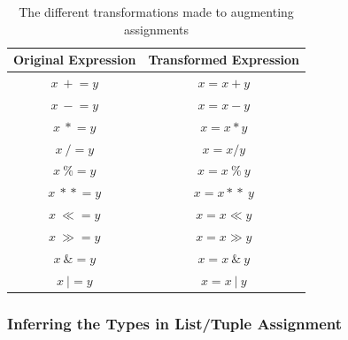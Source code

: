 \documentclass[12pt, titlepage]{article}
\begin{document}
	\begin{table}
	\centering
    \begin{tabular}{ | c | c |}
    \hline
    \textbf{Original Expression} & \textbf{Transformed Expression}  \\ \hline
    $x \: +\!= y$ & $x = x + y$   \\ \hline
    $x \: -\!= y$ & $x = x - y$   \\ \hline
    $x \: *\!= y$ & $x = x * y$   \\ \hline
    $x \: /\!= y$ & $x = x / y$   \\ \hline
    $x \: \%\!= y$ & $x = x \: \% \: y$   \\ \hline
    $x \: *\!*\!= y$ & $x = x *\!* \: y$   \\ \hline
    $x \: \ll = y$ & $x = x \ll y$   \\ \hline
    $x \: \gg = y$ & $x = x \gg y$   \\ \hline
    $x \: \&\!= y$ & $x = x \: \& \: y$   \\ \hline
    $x \: |= y$ & $x = x \: | \: y$   \\ \hline
    \end{tabular}
    \caption{The different transformations made to augmenting assignments}
	\label{table:augAssign}
    \end{table}

\subsubsection{Inferring the Types in List/Tuple Assignment}
\end{document}
